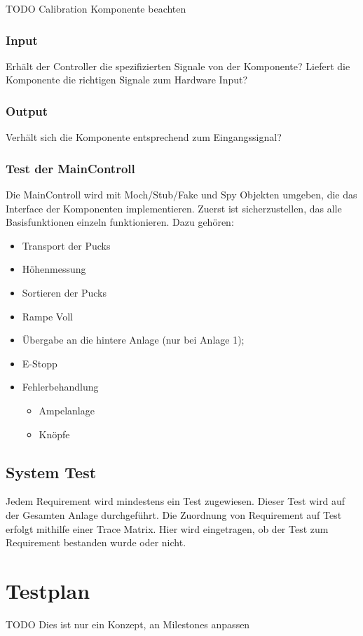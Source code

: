 TODO Calibration Komponente beachten

\subsubsection{Input}
Erhält der Controller die spezifizierten Signale von der Komponente? Liefert die Komponente die richtigen Signale zum Hardware Input?

\subsubsection{Output}
Verhält sich die Komponente entsprechend zum Eingangssignal?

\subsubsection{Test der MainControll}
Die MainControll wird mit Moch/Stub/Fake und Spy Objekten umgeben, die das Interface der Komponenten implementieren.
Zuerst ist sicherzustellen, das alle Basisfunktionen einzeln funktionieren. Dazu gehören:
\begin{itemize} 
	\item Transport der Pucks
	\item Höhenmessung
	\item Sortieren der Pucks
	\item Rampe Voll
	\item Übergabe an die hintere Anlage (nur bei Anlage 1);
	\item E-Stopp
	\item Fehlerbehandlung
	\begin{itemize}
		\item Ampelanlage
		\item Knöpfe
	\end{itemize}
\end{itemize}

\subsection{System Test}
Jedem Requirement wird mindestens ein Test zugewiesen. Dieser Test wird auf der Gesamten Anlage durchgeführt. 
Die Zuordnung von Requirement auf Test erfolgt mithilfe einer Trace Matrix.
Hier wird eingetragen, ob der Test zum Requirement bestanden wurde oder nicht.

\section{Testplan}
TODO Dies ist nur ein Konzept, an Milestones anpassen

